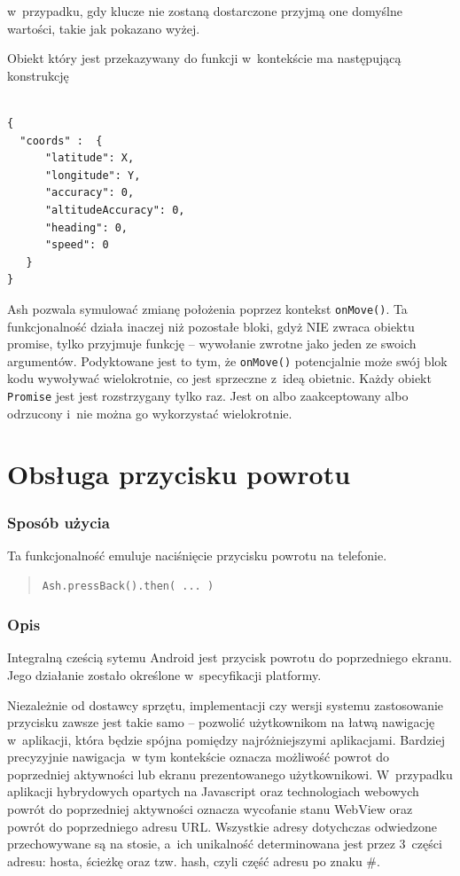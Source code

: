 \documentclass[brudnopis]{xmgr}
\begin{document}
w~przypadku, gdy klucze nie zostaną dostarczone przyjmą one domyślne wartości, takie jak pokazano wyżej. 

Obiekt który jest przekazywany do funkcji w~kontekście ma następującą konstrukcję 

\begin{lstlisting}

{
  "coords" :  {
      "latitude": X, 
      "longitude": Y,
      "accuracy": 0, 
      "altitudeAccuracy": 0, 
      "heading": 0, 
      "speed": 0
   }
}

\end{lstlisting}
Ash pozwala symulować zmianę położenia poprzez kontekst \texttt{onMove()}. Ta funkcjonalność działa inaczej niż pozostałe bloki, gdyż NIE zwraca obiektu promise, tylko przyjmuje funkcję -- wywołanie zwrotne jako jeden ze swoich argumentów. Podyktowane jest to tym, że \texttt{onMove()} potencjalnie może swój blok kodu wywoływać wielokrotnie, co jest sprzeczne z~ideą obietnic. Każdy obiekt \texttt{Promise} jest jest rozstrzygany tylko raz. Jest on albo zaakceptowany albo odrzucony i~nie można go wykorzystać wielokrotnie. 

\section{Obsługa przycisku powrotu}

\subsubsection{Sposób użycia}
Ta funkcjonalność emuluje naciśnięcie przycisku powrotu na telefonie. 

\begin{quote}
  \texttt{Ash.pressBack().then( ... )} 
\end{quote}

\subsubsection{Opis}

Integralną cześcią sytemu Android jest przycisk powrotu do poprzedniego ekranu. Jego działanie zostało określone w~specyfikacji platformy.

Niezależnie od dostawcy sprzętu, implementacji czy wersji systemu zastosowanie przycisku zawsze jest takie samo -- pozwolić użytkownikom na łatwą nawigację w~aplikacji, która będzie spójna pomiędzy najróżniejszymi aplikacjami. Bardziej precyzyjnie nawigacja~w tym kontekście  oznacza możliwość powrot do poprzedniej aktywności lub ekranu prezentowanego użytkownikowi. W~przypadku aplikacji hybrydowych opartych na Javascript oraz technologiach webowych powrót do poprzedniej aktywności oznacza wycofanie stanu WebView oraz powrót do poprzedniego adresu URL. Wszystkie adresy dotychczas odwiedzone przechowywane są na stosie, a~ich unikalność determinowana jest przez 3~części adresu: hosta, ścieżkę oraz tzw. hash, czyli część adresu po znaku \#. 
\end{document}
